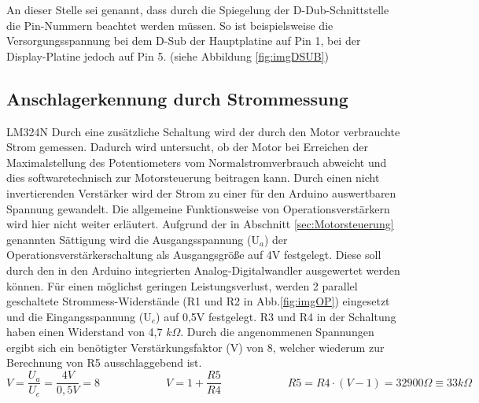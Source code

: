 \documentclass[11pt, titlepage, fleqn]{report}
\begin{document}
				An dieser Stelle sei genannt, dass durch die Spiegelung der D-Dub-Schnittstelle die Pin-Nummern beachtet werden müssen. So ist beispielsweise die Versorgungsspannung bei dem D-Sub der Hauptplatine auf Pin 1, bei der Display-Platine jedoch auf Pin 5. (siehe Abbildung \ref{fig:imgDSUB})
			\newpage
			\subsection{Anschlagerkennung durch Strommessung}
			\label{sec:op}
				LM324N Durch eine zusätzliche Schaltung wird der durch den Motor verbrauchte Strom gemessen. Dadurch wird untersucht, ob der Motor bei Erreichen der Maximalstellung des Potentiometers vom Normalstromverbrauch abweicht und dies softwaretechnisch zur Motorsteuerung beitragen kann. Durch einen nicht invertierenden Verstärker wird der Strom zu einer für den Arduino auswertbaren Spannung gewandelt. Die allgemeine Funktionsweise von Operationsverstärkern wird hier nicht weiter erläutert. Aufgrund der in Abschnitt \ref{sec:Motorsteuerung} genannten Sättigung wird die Ausgangsspannung (U$_{a}$) der Operationsverstärkerschaltung als Ausgangsgröße auf 4V festgelegt. Diese soll durch den in den Arduino integrierten Analog-Digitalwandler ausgewertet werden können. Für einen möglichst geringen Leistungsverlust, werden 2 parallel geschaltete Strommess-Widerstände (R1 und R2 in Abb.\ref{fig:imgOP}) eingesetzt und die Eingangsspannung (U$_{e}$) auf 0,5V festgelegt. R3 und R4 in der Schaltung haben einen Widerstand von 4,7 $k\Omega$. Durch die angenommenen Spannungen ergibt sich ein benötigter Verstärkungsfaktor (V) von 8, welcher wiederum zur Berechnung von R5 ausschlaggebend ist.
				\begin{equation}
					V = \frac{U_a}{U_e} =\frac{4V}{0,5V}= 8 \hspace{6em} V = 1+\frac{R5}{R4} \hspace{6em} R5 = R4\cdot(V-1) = 32900\Omega \equiv 33k\Omega
				\end{equation}
\end{document}
